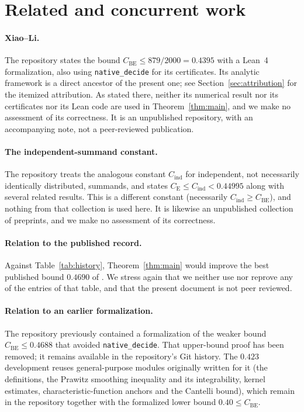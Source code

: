 \documentclass[11pt,a4paper]{article}
\theoremstyle{definition}
\newcommand{\Lean}[1]{\texttt{#1}}
\begin{document}
\section{Related and concurrent work}
\label{sec:related}

\paragraph{Xiao--Li.} The repository \cite{XiaoLi2026} states the bound
$C_{\mathrm{BE}}\le 879/2000=0.4395$ with a Lean~4 formalization, also using
\Lean{native\_decide} for its certificates. Its analytic framework is a direct
ancestor of the present one; see Section~\ref{sec:attribution} for the itemized
attribution. As stated there, neither its numerical result nor its certificates
nor its Lean code are used in Theorem~\ref{thm:main}, and we make no assessment
of its correctness. It is an unpublished repository, with an accompanying note,
not a peer-reviewed publication.

\paragraph{The independent-summand constant.} The repository
\cite{IndependentBE2026} treats the analogous constant $C_{\mathrm{ind}}$ for
independent, not necessarily identically distributed, summands, and states
$C_{\mathrm{E}}\le C_{\mathrm{ind}}<0.44995$ along with several related results.
This is a different constant (necessarily $C_{\mathrm{ind}}\ge C_{\mathrm{BE}}$),
and nothing from that collection is used here. It is likewise an unpublished
collection of preprints, and we make no assessment of its correctness.

\paragraph{Relation to the published record.} Against
Table~\ref{tab:history}, Theorem~\ref{thm:main} would improve the best published
bound $0.4690$ of \cite{Shevtsova2013}. We stress again that we neither use nor
reprove any of the entries of that table, and that the present document is not
peer reviewed.

\paragraph{Relation to an earlier formalization.} The repository previously
contained a formalization of the weaker bound $C_{\mathrm{BE}}\le0.4688$ that
avoided \Lean{native\_decide}. That upper-bound proof has been removed; it remains
available in the repository's Git history. The $0.423$ development reuses
general-purpose modules originally written for it (the definitions, the Prawitz
smoothing inequality and its integrability, kernel estimates, characteristic-function
anchors and the Cantelli bound), which remain in the repository together with the
formalized lower bound $0.40\le C_{\mathrm{BE}}$.
\end{document}
